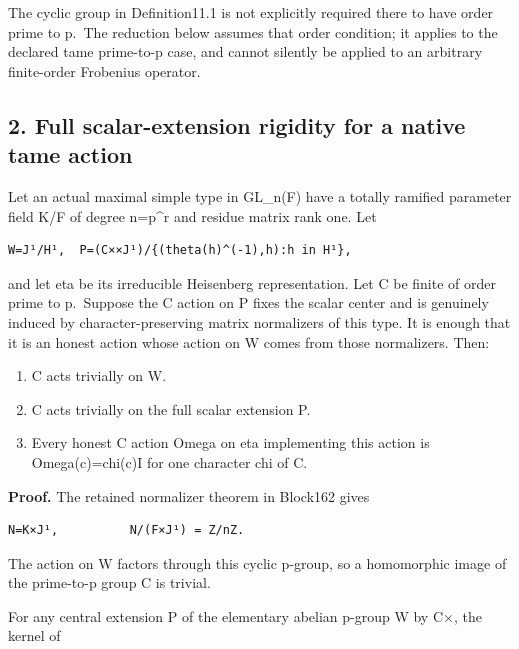 The cyclic group in Definition11.1 is not explicitly required there to
have order prime to p.~The reduction below assumes that order condition;
it applies to the declared tame prime-to-p case, and cannot silently be
applied to an arbitrary finite-order Frobenius operator.

\hypertarget{stabilizer_contract-full-scalar-extension-rigidity-for-a-native-tame-action}{%
\subsection{2. Full scalar-extension rigidity for a native tame
action}\label{stabilizer_contract-full-scalar-extension-rigidity-for-a-native-tame-action}}

Let an actual maximal simple type in GL\_n(F) have a totally ramified
parameter field K/F of degree n=p\^{}r and residue matrix rank one. Let

\begin{Verbatim}[fontsize=\small,breaklines=true,breakanywhere=true]
W=J¹/H¹,  P=(C××J¹)/{(theta(h)^(-1),h):h in H¹},
\end{Verbatim}

and let eta be its irreducible Heisenberg representation. Let C be
finite of order prime to p.~Suppose the C action on P fixes the scalar
center and is genuinely induced by character-preserving matrix
normalizers of this type. It is enough that it is an honest action whose
action on W comes from those normalizers. Then:

\begin{enumerate}
\def\labelenumi{\arabic{enumi}.}
\tightlist
\item
  C acts trivially on W.
\item
  C acts trivially on the full scalar extension P.
\item
  Every honest C action Omega on eta implementing this action is
  Omega(c)=chi(c)I for one character chi of C.
\end{enumerate}

\textbf{Proof.} The retained normalizer theorem in Block162 gives

\begin{Verbatim}[fontsize=\small,breaklines=true,breakanywhere=true]
N=K×J¹,          N/(F×J¹) = Z/nZ.
\end{Verbatim}

The action on W factors through this cyclic p-group, so a homomorphic
image of the prime-to-p group C is trivial.

For any central extension P of the elementary abelian p-group W by C×,
the kernel of

